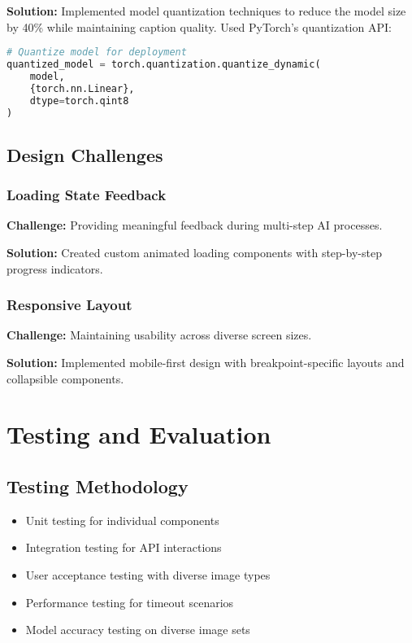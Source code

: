 \documentclass[12pt,a4paper]{report}
\begin{document}
\textbf{Solution:} Implemented model quantization techniques to reduce the model size by 40\% while maintaining caption quality. Used PyTorch's quantization API:

\begin{lstlisting}[language=python, caption=Model Quantization]
# Quantize model for deployment
quantized_model = torch.quantization.quantize_dynamic(
    model, 
    {torch.nn.Linear}, 
    dtype=torch.qint8
)
\end{lstlisting}

\section{Design Challenges}
\subsection{Loading State Feedback}
\textbf{Challenge:} Providing meaningful feedback during multi-step AI processes.

\textbf{Solution:} Created custom animated loading components with step-by-step progress indicators.

\subsection{Responsive Layout}
\textbf{Challenge:} Maintaining usability across diverse screen sizes.

\textbf{Solution:} Implemented mobile-first design with breakpoint-specific layouts and collapsible components.

\chapter{Testing and Evaluation}
\section{Testing Methodology}
\begin{itemize}
    \item Unit testing for individual components
    \item Integration testing for API interactions
    \item User acceptance testing with diverse image types
    \item Performance testing for timeout scenarios
    \item Model accuracy testing on diverse image sets
\end{itemize}
\end{document}
